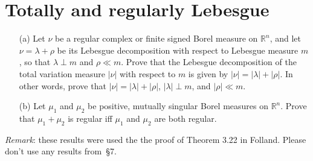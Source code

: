 \documentclass[lang=cn,11pt]{elegantbook}
\begin{document}
\section{Totally and regularly Lebesgue}
  \begin{itemize}
  \item[(a)]    Let $\nu$ be a regular complex or finite signed Borel measure on $\mathbb{R}^n$, and let $\nu=\lambda+\rho$ be its Lebesgue decomposition with respect to Lebesgue measure $m$, so that $\lambda\perp m$ and $\rho\ll m$. Prove that the Lebesgue decomposition of the total variation measure $|\nu|$ with respect to $m$ is given by $|\nu|=|\lambda|+|\rho|$. In other words, prove that $|\nu|=|\lambda|+|\rho|$, $|\lambda|\perp m$, and $|\rho|\ll m$.
  \item[(b)]Let $\mu_1$ and $\mu_2$ be positive, mutually singular Borel measures on $\mathbb{R}^n$. Prove that $\mu_1+\mu_2$ is regular iff $\mu_1$ and $\mu_2$ are both regular.
  \end{itemize}
\textit{Remark}: these results were used the the proof of Theorem 3.22 in Folland. Please don't use any results from~\S7.
\end{document}
